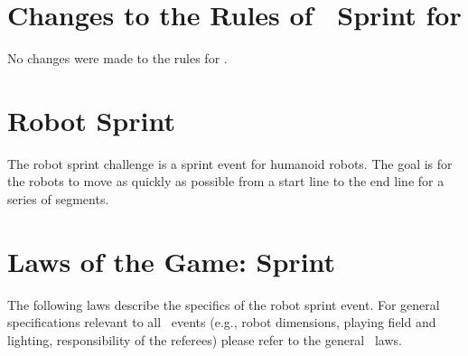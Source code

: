 \documentclass[12pt]{hurocup}
\begin{document}
\section*{Changes to the Rules of \HuroCup\ Sprint for \thisyear}

No changes were made to the rules for \thisyear.

\newpage

\section{Robot Sprint}
\label{sec:robot-sprint}

The robot sprint challenge is a sprint event for humanoid robots. The
goal is for the robots to move as quickly as possible from a start
line to the end line for a series of segments.

\section{Laws of the Game: Sprint}
\label{sec:laws-sprint}

The following laws describe the specifics of the robot sprint event. For
general specifications relevant to all \HuroCup\ events (e.g., robot
dimensions, playing field and lighting, responsibility of the
referees) please refer to the general \HuroCup\ laws.

\label{law:field-of-play}
\end{document}
